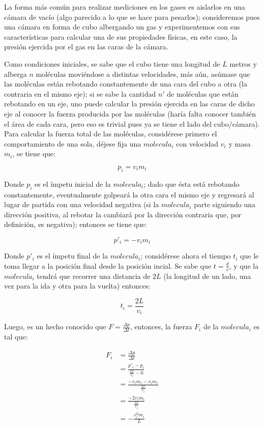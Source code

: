 \documentclass{article}
\begin{document}
La forma más común para realizar mediciones en los gases es
aislarlos en una cámara de vacío (algo parecido a lo que se
hace para pesarlos); consideremos pues una cámara en forma de cubo
albergando un gas y experimentemos con sus características para
calcular una de sus propiedades físicas, en este caso, la presión
ejercida por el gas en las caras de la cámara.

Como condiciones iniciales, se sabe que el cubo tiene una longitud
de \(L\) metros y alberga \(n\) moléculas moviéndose a distintas
velocidades, más aún, asúmase que las moléculas están rebotando
constantemente de una cara del cubo a otra (la contraria en el mismo eje);
si se sabe la cantidad \(n'\) de moléculas que están rebotando en un eje,
uno puede calcular la presión ejercida en las caras de dicho eje
al conocer la fuerza producida por las moléculas (haría falta conocer
también el área de cada cara, pero eso es trivial pues ya se tiene
el lado del cubo/cámara). Para calcular la fuerza total de las moléculas,
considérese primero el comportamiento de una sola, déjese fija una \(molecula_i\)
con velocidad \(v_i\) y masa \(m_i\), se tiene que:

\[
    p_i = v_i m_i
\]

Donde \(p_i\) es el ímpetu inicial de la \(molecula_i\); dado que ésta
está rebotando constantemente, eventualmente golpeará la otra cara el
mismo eje y regresará al lugar de partida con una velocidad negativa
(si la \(molecula_i\) parte siguiendo una dirección positiva,
al rebotar la cambiará por la dirección contraria que, por definición,
es negativa); entonces se tiene que:

\[
    p'_i = -v_i m_i
\]

Donde \(p'_i\) es el ímpetu final de la \(molecula_i\); considérese ahora
el tiempo \(t_i\) que le toma llegar a la posición final desde la
posición incial. Se sabe que \(t = \frac{d}{v}\), y que la \(molecula_i\)
tendrá que recorrer una distancia de \(2L\) (la longitud de un lado,
una vez para la ida y otra para la vuelta) entonces:

\[
    t_i = \frac{2L}{v_i}
\]

Luego, es un hecho conocido que \(F = \frac{\Delta p}{\Delta t}\), entonces,
la fuerza \(F_i\) de la \(molecula_i\) es tal que:

\begin{align*}
    F_i & = \frac{\Delta p}{\Delta t}                 \\
        & = \frac{p'_i - p_i}{\frac{2L}{v_i} - 0}     \\
        & = \frac{-v_i m_i - v_i m_i}{\frac{2L}{v_i}} \\
        & = \frac{-2v_i m_i}{\frac{2L}{v_i}}          \\
        & = -\frac{v^2_i m_i}{L}
\end{align*}
\end{document}
